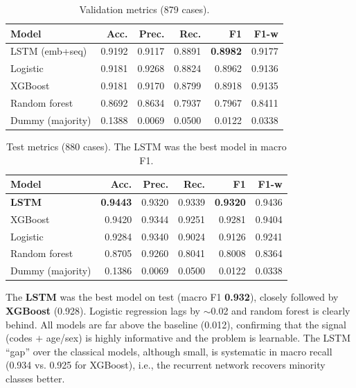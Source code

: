 \documentclass{ieeeaccess}
\begin{document}
\begin{table}[!t]
\caption{Validation metrics (879 cases).}
\label{tab:val}
\footnotesize
\centering
\begin{tabular}{lrrrrr}
\hline
\textbf{Model} & \textbf{Acc.} & \textbf{Prec.} & \textbf{Rec.} & \textbf{F1} & \textbf{F1-w} \\
\hline
LSTM (emb+seq) & 0.9192 & 0.9117 & 0.8891 & \textbf{0.8982} & 0.9177 \\
Logistic & 0.9181 & 0.9268 & 0.8824 & 0.8962 & 0.9136 \\
XGBoost & 0.9181 & 0.9170 & 0.8799 & 0.8918 & 0.9135 \\
Random forest & 0.8692 & 0.8634 & 0.7937 & 0.7967 & 0.8411 \\
Dummy (majority) & 0.1388 & 0.0069 & 0.0500 & 0.0122 & 0.0338 \\
\hline
\end{tabular}
\end{table}

\begin{table}[!b]
\caption{Test metrics (880 cases). The LSTM was the best model in macro F1.}
\label{tab:test}
\footnotesize
\centering
\begin{tabular}{lrrrrr}
\hline
\textbf{Model} & \textbf{Acc.} & \textbf{Prec.} & \textbf{Rec.} & \textbf{F1} & \textbf{F1-w} \\
\hline
\textbf{LSTM} & \textbf{0.9443} & 0.9320 & 0.9339 & \textbf{0.9320} & 0.9436 \\
XGBoost & 0.9420 & 0.9344 & 0.9251 & 0.9281 & 0.9404 \\
Logistic & 0.9284 & 0.9340 & 0.9024 & 0.9126 & 0.9241 \\
Random forest & 0.8705 & 0.9260 & 0.8041 & 0.8008 & 0.8364 \\
Dummy (majority) & 0.1386 & 0.0069 & 0.0500 & 0.0122 & 0.0338 \\
\hline
\end{tabular}
\end{table}

The \textbf{LSTM} was the best model on test (macro F1 \textbf{0.932}), closely followed by \textbf{XGBoost} (0.928). Logistic regression lags by $\sim$0.02 and random forest is clearly behind. All models are far above the baseline (0.012), confirming that the signal (codes $+$ age/sex) is highly informative and the problem is learnable. The LSTM ``gap'' over the classical models, although small, is systematic in macro recall (0.934 vs. 0.925 for XGBoost), i.e., the recurrent network recovers minority classes better.
\end{document}
